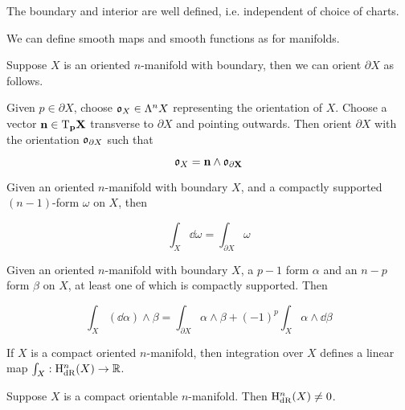 \begin{lemma}
    The boundary and interior are well defined, i.e. independent of choice of charts.
\end{lemma}

We can define smooth maps and smooth functions as for manifolds.

\begin{definition}
     Suppose \(X\) is an oriented \(n\)-manifold with boundary, then we can orient \(\partial X\) as follows.

    Given \(p \in \partial X\), choose \(\mathfrak{o}_X \in \Lambda^nX\) representing the orientation of \(X\). Choose a vector \(\bf n \in \mathrm{T}_p X\) transverse to \(\partial X\) and pointing outwards. Then orient \(\partial X\) with the orientation \(\mathfrak{o}_{\partial X}\) such that

    \[\mathfrak{o}_X = \bf n \wedge \mathfrak{o}_{\partial X}\]
\end{definition}

\begin{theorem}
     Given an oriented \(n\)-manifold with boundary \(X\), and a compactly supported \((n-1)\)-form \(\omega\) on \(X\), then

    \[\int_X \dd \omega = \int_{\partial X}\omega\]
\end{theorem}

\begin{proposition}

    Given an oriented \(n\)-manifold with boundary \(X\), a \(p-1\) form \(\alpha\) and an \(n-p\) form \(\beta\) on \(X\), at least one of which is compactly supported. Then

    \[\int_X(\dd\alpha)\wedge \beta = \int_{\partial X}\alpha \wedge \beta + (-1)^p \int_X\alpha \wedge \dd\beta\]
\end{proposition}

\begin{proposition}
    If \(X\) is a compact oriented \(n\)-manifold, then integration over \(X\) defines a linear map \(\int_X : \mathrm{H}_\mathrm{dR}^n(X) \to \mathbb{R}\).
\end{proposition}

\begin{corollary}
    Suppose \(X\) is a compact orientable \(n\)-manifold. Then \(\mathrm{H}_\mathrm{dR}^n(X) \ne 0\).
\end{corollary}
